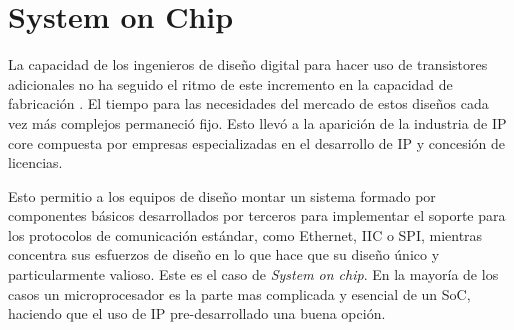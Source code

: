 	

\section{System on Chip}

 La capacidad de los ingenieros de diseño digital para hacer uso de transistores adicionales no ha seguido el ritmo de este incremento en la capacidad de fabricación \cite{Etiqueta05}. El tiempo para las necesidades del mercado de estos diseños cada vez más complejos permaneció fijo. 
Esto llevó a la aparición de la industria de IP core compuesta por empresas especializadas en el desarrollo de IP y concesión de licencias.

Esto permitio a los equipos de diseño montar un sistema formado por componentes básicos desarrollados por terceros para implementar el soporte para los protocolos de comunicación estándar, como Ethernet, IIC o SPI, mientras concentra sus esfuerzos de diseño en  lo que hace que su diseño único y particularmente valioso. Este es el caso de \textit{System on chip}.
En la mayoría de los casos un microprocesador es la parte mas complicada y esencial de un SoC, haciendo que el uso de IP pre-desarrollado una buena opción.



